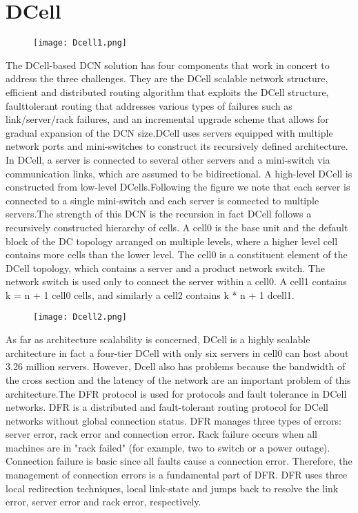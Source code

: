 \documentclass[]{article}
\begin{document}
\section{DCell}
\begin{center}
	\begin{figure}[htbp]
		\centering
		\texttt{[image: Dcell1.png]}	
	\end{figure}
\end{center}
The DCell-based DCN solution has four components that work in concert to address the three challenges. They are the DCell scalable network structure, efficient and distributed routing algorithm that exploits the DCell structure, faulttolerant routing that addresses various types of failures such as link/server/rack failures, and an incremental upgrade scheme that allows for gradual expansion of the DCN size.DCell uses servers equipped with multiple network ports and mini-switches to construct its recursively defined architecture. In DCell, a server is connected to several other servers and a mini-switch via communication links, which are assumed to be bidirectional. A high-level DCell is constructed from low-level DCells.Following the figure we note that each server is connected to a single mini-switch and each server is connected to multiple servers.The strength of this DCN is the recursion in fact DCell follows a recursively constructed hierarchy of cells. A cell0 is the base unit and the default block of the DC topology arranged on multiple levels, where a higher level cell contains more cells than the lower level. The cell0 is a constituent element of the DCell topology, which contains a server and a product network switch. The network switch is used only to connect the server within a cell0. A cell1 contains k = n + 1 cell0 cells, and similarly a cell2 contains k * n + 1 dcell1.
\begin{center}
	\begin{figure}[htbp]
		\centering
		\texttt{[image: Dcell2.png]}	
	\end{figure}
\end{center}
As far as architecture scalability is concerned, DCell is a highly scalable architecture in fact a four-tier DCell with only six servers in cell0 can host about 3.26 million servers. However, Dcell also has problems because the bandwidth of the cross section and the latency of the network are an important problem of this architecture.The DFR protocol is used for protocols and fault tolerance in DCell networks. DFR is a distributed and fault-tolerant routing protocol for
DCell networks without global connection status. DFR manages three types of errors: server error, rack error and connection error. Rack failure occurs when all machines are in
"rack failed" (for example, two to switch or a power outage). Connection failure is basic since all faults cause a connection error.
Therefore, the management of connection errors is a fundamental part of DFR. DFR uses three local redirection techniques, local link-state and jumps back to resolve the link error, server error and rack error, respectively.
\end{document}
